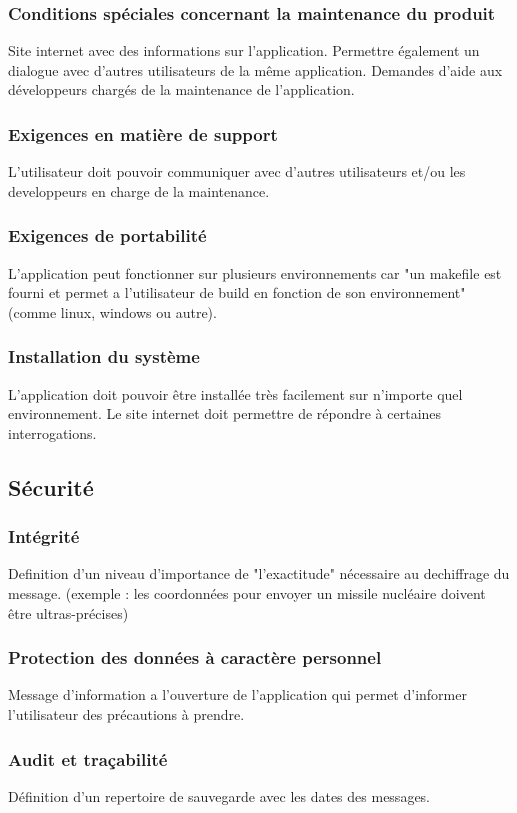 \documentclass[a4]{article}
\begin{document}
			\subsubsection {Conditions spéciales concernant la maintenance du produit}
				Site internet avec des informations sur l'application.
				Permettre également un dialogue avec d'autres utilisateurs de la même application.
				Demandes d'aide aux développeurs chargés de la maintenance de l'application.
			\subsubsection {Exigences en matière de support}
				L'utilisateur doit pouvoir communiquer avec d'autres utilisateurs et/ou les developpeurs en 					charge de la maintenance.
			\subsubsection {Exigences de portabilité}
				L'application peut fonctionner sur plusieurs environnements car "un makefile est fourni et 				permet a l'utilisateur de build en fonction de son environnement"(comme linux, windows ou autre).
			\subsubsection {Installation du système}
				L'application doit pouvoir être installée très facilement sur n'importe quel environnement.
				Le site internet doit permettre de répondre à certaines interrogations.
		\subsection{Sécurité}
			\subsubsection {Intégrité}
				Definition d'un niveau d'importance de "l'exactitude" nécessaire au dechiffrage du message.
				(exemple : les coordonnées pour envoyer un missile nucléaire doivent être ultras-précises)
			\subsubsection {Protection des données à caractère personnel}
				Message d'information a l'ouverture de l'application qui permet d'informer l'utilisateur des 					précautions à prendre.
			\subsubsection {Audit et traçabilité}
				Définition d'un repertoire de sauvegarde avec les dates des messages.
\end{document}
